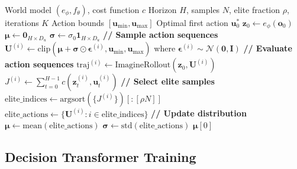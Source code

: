 \begin{algorithm}[H]
\caption{CEM-based Model Predictive Control}
\begin{algorithmic}[1]
\Require World model $(e_\phi, f_\theta)$, cost function $c$
\Require Horizon $H$, samples $N$, elite fraction $\rho$, iterations $K$
\Require Action bounds $[\mathbf{u}_{\min}, \mathbf{u}_{\max}]$
\Ensure Optimal first action $\mathbf{u}_0^*$
    \State $\mathbf{z}_0 \gets e_\phi(\mathbf{o}_0)$
    \State $\boldsymbol{\mu} \gets \mathbf{0}_{H \times D_u}$ 
    \State $\boldsymbol{\sigma} \gets \sigma_0 \mathbf{1}_{H \times D_u}$ 
        \State \textbf{// Sample action sequences}
            \State $\mathbf{U}^{(i)} \gets \text{clip}(\boldsymbol{\mu} + \boldsymbol{\sigma} \odot \boldsymbol{\epsilon}^{(i)}, \mathbf{u}_{\min}, \mathbf{u}_{\max})$
            \State where $\boldsymbol{\epsilon}^{(i)} \sim \mathcal{N}(\mathbf{0}, \mathbf{I})$
        \EndFor
        \State \textbf{// Evaluate action sequences}
            \State $\text{traj}^{(i)} \gets \text{ImagineRollout}(\mathbf{z}_0, \mathbf{U}^{(i)})$
            \State $J^{(i)} \gets \sum_{t=0}^{H-1} c(\mathbf{z}_t^{(i)}, \mathbf{u}_t^{(i)})$
        \EndFor
        \State \textbf{// Select elite samples}
        \State $\text{elite\_indices} \gets \text{argsort}(\{J^{(i)}\})[:[\rho N]]$
        \State $\text{elite\_actions} \gets \{\mathbf{U}^{(i)} : i \in \text{elite\_indices}\}$
        \State \textbf{// Update distribution}
        \State $\boldsymbol{\mu} \gets \text{mean}(\text{elite\_actions})$
        \State $\boldsymbol{\sigma} \gets \text{std}(\text{elite\_actions})$
    \EndFor
    \State \Return $\boldsymbol{\mu}[0]$ 
\EndProcedure
\end{algorithmic}
\end{algorithm}

\subsection{Decision Transformer Training}

